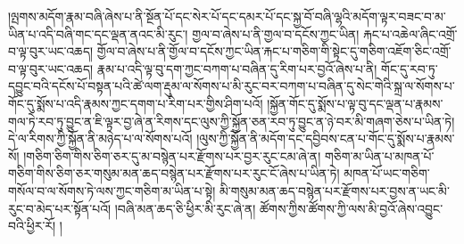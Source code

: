 །ལྤགས་མདོག་རྣམ་བཞི་ཞེས་པ་ནི་སྔོན་པོ་དང་སེར་པོ་དང་དམར་པོ་དང་སྐྱ་བོ་བཞི་ལྷའི་མདོག་ལྟར་བཟང་བ་མ་ཡིན་པ་འདི་བཞི་གང་དང་ལྡན་ནའང་མི་རུང་། གྱལ་བ་ཞེས་པ་ནི་གྱལ་བ་དངོས་ཀྱང་ཡིན། རྐང་པ་འཆེལ་ཞིང་འགྲོ་བ་ལྟ་བུར་ཡང་འཆད། གྱོལ་བ་ཞེས་པ་ནི་གྱོལ་བ་དངོས་ཀྱང་ཡིན་རྐང་པ་གཅིག་གི་སྟེང་དུ་གཅིག་འཇོག་ཅིང་འགྲོ་བ་ལྟ་བུར་ཡང་འཆད། རྣམ་པ་འདི་ལྟ་བུ་དག་ཀྱང་བཀག་པ་བཞིན་དུ་རིག་པར་བྱའོ་ཞེས་པ་ནི། གོང་དུ་རབ་ཏུ་དབྱུང་བའི་དངོས་པོ་བསྟན་པའི་ཚེ་ལག་རྡུམ་ལ་སོགས་པ་མི་རུང་བར་བཀག་པ་བཞིན་དུ་སེང་གེའི་སྐྲ་ལ་སོགས་པ་གོང་དུ་སྨོས་པ་འདི་རྣམས་ཀྱང་དགག་པ་རིག་པར་གྱིས་ཤིག་པའོ། །སྐྱོན་གོང་དུ་སྨོས་པ་ལྟ་བུ་དང་ལྡན་པ་རྣམས་གལ་ཏེ་རབ་ཏུ་བྱུང་ན་ཇི་ལྟར་བྱ་ཞེ་ན་རིགས་དང་ལུས་ཀྱི་སྐྱོན་ཅན་རབ་ཏུ་བྱུང་ན་ཉེ་བར་མི་གཞག་ཅེས་པ་ཡིན་ཏེ། དེ་ལ་རིགས་ཀྱི་སྐྱོན་ནི་མཉེད་པ་ལ་སོགས་པའོ། །ལུས་ཀྱི་སྐྱོན་ནི་མདོག་དང་དབྱིབས་ངན་པ་གོང་དུ་སྨོས་པ་རྣམས་སོ། །གཅིག་ཅིག་གིས་ཅིག་ཅར་དུ་མ་བསྙེན་པར་རྫོགས་པར་བྱར་རུང་ངམ་ཞེ་ན། གཅིག་མ་ཡིན་པ་མཁན་པོ་གཅིག་གིས་ཅིག་ཅར་གསུམ་མན་ཆད་བསྙེན་པར་རྫོགས་པར་རུང་ངོ་ཞེས་པ་ཡིན་ཏེ། མཁན་པོ་ཡང་གཅིག་གསོལ་བ་ལ་སོགས་ཏེ་ལས་ཀྱང་གཅིག་མ་ཡིན་པ་སྟེ། མི་གསུམ་མན་ཆད་བསྙེན་པར་རྫོགས་པར་བྱས་ན་ཡང་མི་རུང་བ་མེད་པར་སྟོན་པའོ། །བཞི་མན་ཆད་ཅི་ཕྱིར་མི་རུང་ཞེ་ན། ཚོགས་ཀྱིས་ཚོགས་ཀྱི་ལས་མི་བྱའོ་ཞེས་འབྱུང་བའི་ཕྱིར་རོ། །
